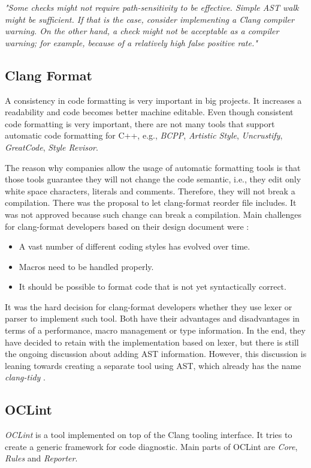 \label{clang-analyzer-checkers}
\emph{"Some checks might not require path-sensitivity to be effective. Simple AST walk might be sufficient. If that is the case, consider implementing a Clang compiler warning. On the other hand, a check might not be acceptable as a compiler warning; for example, because of a relatively high false positive rate."}

\subsection{Clang Format}
\label{clang-format}
A consistency in code formatting is very important in big projects. It increases a readability and code becomes better machine editable. Even though consistent code formatting is very important, there are not many tools that support automatic code formatting for C++, e.g., \emph{BCPP}, \emph{Artistic Style}, \emph{Uncrustify}, \emph{GreatCode}, \emph{Style Revisor}.

The reason why companies allow the usage of automatic formatting tools is that those tools guarantee they will not change the code semantic, i.e., they edit only white space characters, literals and comments. Therefore, they will not break a compilation. There was the proposal to let clang-format reorder file includes. It was not approved because such change can break a compilation. Main challenges for clang-format developers based on their design document were \cite{clang-format-design}:

\begin{itemize}
\item A vast number of different coding styles has evolved over time.
\item Macros need to be handled properly.
\item It should be possible to format code that is not yet syntactically correct.
\end{itemize}

It was the hard decision for clang-format developers whether they use lexer or parser to implement such tool. Both have their advantages and disadvantages in terms of a performance, macro management or type information. In the end, they have decided to retain with the implementation based on lexer, but there is still the ongoing discussion about adding AST information. However, this discussion is leaning towards creating a separate tool using AST, which already has the name \emph{clang-tidy} \cite{clang-tidy}.

\subsection{OCLint}
\emph{OCLint} \cite{oclint} is a tool implemented on top of the Clang tooling interface. It tries to create  a generic framework for code diagnostic. Main parts of OCLint are \emph{Core}, \emph{Rules} and \emph{Reporter}.


